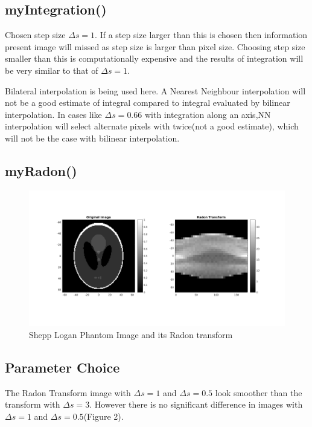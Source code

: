 \documentclass[11pt]{article}
\begin{document}
\maketitle

\subsection{myIntegration()}
Chosen step size $\Delta s = 1$. If a step size larger than this is chosen then information present image will missed as step size is larger than pixel size.
Choosing step size smaller than this is computationally expensive and the results of integration will be very similar to that of $\Delta s = 1$.

Bilateral interpolation is being used here. A Nearest Neighbour interpolation will not be a good estimate of integral compared to integral evaluated by bilinear interpolation.
In cases like $\Delta s = 0.66$ with integration along an axis,NN interpolation will select alternate pixels with twice(not a good estimate), which will not be the case with bilinear interpolation.
\subsection{myRadon()}

\begin{figure}[h]
\centering
\includegraphics[scale=0.4]{b}
\caption{Shepp Logan Phantom Image and its Radon transform}
\end{figure}

\subsection{Parameter Choice}
The Radon Transform image with $\Delta s=1$ and $\Delta s=0.5$ look smoother than the transform with $\Delta s=3$. 
However there is no significant difference in images with $\Delta s=1$ and $\Delta s=0.5$(Figure 2).
\end{document}
